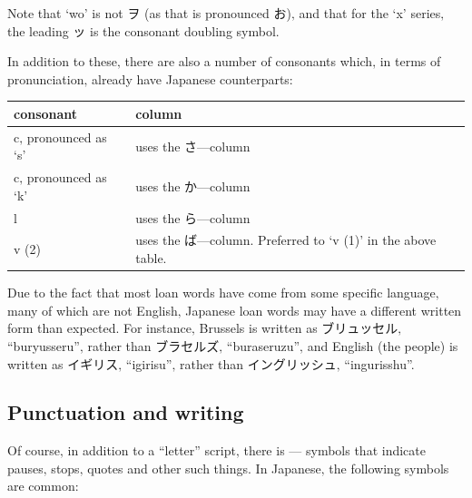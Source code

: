 \documentclass[11pt, b5paper, twoside, openright, onecolumn]{book}
\newenvironment{mytabularcentered}[1]{\noindent
\begin{center}\begin{tabular}[h]{#1}}{\end{tabular}\end{center}}
\begin{document}
Note that ‘wo’ is not ヲ (as that is pronounced お)‚ and that for the ‘x’ series‚ the leading ッ is the consonant doubling symbol.

In addition to these‚ there are also a number of consonants which‚ in terms of pronunciation‚ already have Japanese counterparts:

\vspace{0.5cm}
\smaller
\begin{center}
\begin{mytabularcentered}{| l  l |}\hline 
\rule{0pt}{2.4ex}consonant & column\\ 
\hline
\rule{0pt}{2.4ex}c‚ pronounced as ‘s’ & uses the さ—column\\ 
\rule{0pt}{2.4ex}c‚ pronounced as ‘k’ & uses the か—column\\ 
\rule{0pt}{2.4ex}l & uses the ら—column\\ 
\rule{0pt}{2.4ex}v (2) & uses the ば—column. Preferred to ‘v (1)’ in the above table.\\ 
\hline 
\end{mytabularcentered}
\end{center}
\larger
\vspace{0.5cm}


Due to the fact that most loan words have come from some specific language‚ many of which are not English‚ Japanese loan words may have a different written form than expected. For instance‚ Brussels is written as ブリュッセル‚ “buryusseru”‚ rather than ブラセルズ‚ “buraseruzu”‚ and English (the people) is written as イギリス‚ “igirisu”‚ rather than イングリッシュ‚ “ingurisshu”.

\subsection{Punctuation and writing}

Of course‚ in addition to a “letter” script‚ there is  — symbols that indicate pauses‚ stops‚ quotes and other such things. In Japanese‚ the following  symbols are common:
\end{document}
